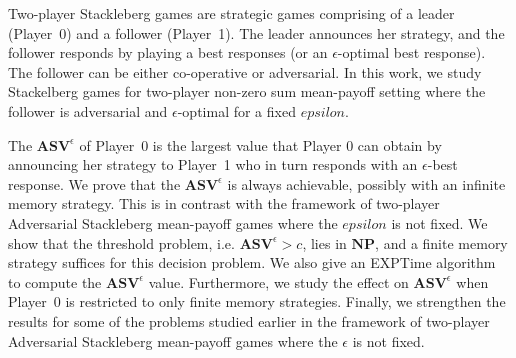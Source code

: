 Two-player Stackleberg games are strategic games comprising of a leader (Player~0) and a follower (Player~1). The leader announces her strategy, and the follower responds by playing a best responses (or an $\epsilon$-optimal best response). The follower can be either co-operative or adversarial. In this work, we study Stackelberg games for two-player non-zero sum mean-payoff setting where the follower is adversarial and $\epsilon$-optimal for a fixed $epsilon$.

The $\mathbf{ASV}^{\epsilon}$ of Player~0 is the largest value that Player 0 can obtain by announcing her strategy to Player~1 who in turn responds with an $\epsilon$-best response. 
We prove that the $\mathbf{ASV}^{\epsilon}$ is always achievable, possibly with an infinite memory strategy.
This is in contrast with the framework of two-player Adversarial Stackleberg mean-payoff games where the $epsilon$ is not fixed.
We show that the threshold problem, i.e. $\mathbf{ASV}^{\epsilon} > c$, lies in $\textbf{NP}$, and a finite memory strategy suffices for this decision problem.
We also give an {\sf EXPTime} algorithm to compute the $\mathbf{ASV}^{\epsilon}$ value.
Furthermore, we study the effect on $\mathbf{ASV}^{\epsilon}$ when Player~0 is restricted to only finite memory strategies.
Finally, we strengthen the results for some of the problems studied earlier in the framework of two-player Adversarial Stackleberg mean-payoff games where the $\epsilon$ is not fixed.